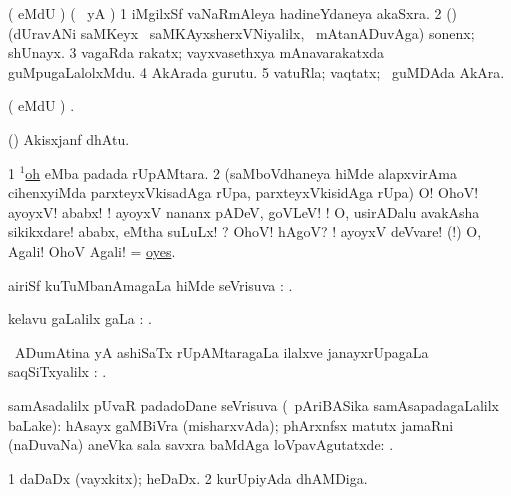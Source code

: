 \bentry
{}
\gl{\nA}
\bmng
( eMdU \parx) (\bava\  yA ) 
\bnum
\num{1} iMgilxSf vaNaRmAleya hadineYdaneya akaSxra. 
\hypertarget{O(1)2}{} 
\num{2} () (dUravANi saMKeyx \mo\ saMKAyxsherxVNiyalilx, \kanmu\ mAtanADuvAga) sonenx; shUnayx. 
\num{3}  vagaRda rakatx;  vayxvasethxya mAnavarakatxda guMpugaLalolxMdu. 
\num{4}  AkArada gurutu. 
\num{5} vatuRla; vaqtatx; \kanmu\ guMDAda AkAra. 
\enum
\emng
\eentry

\bentry
{}
\gl{\saMkiSx}
\bmng
( eMdU \parx) . 
\emng
\eentry

\bentry
{}
\gl{\saMkeV}
\bmng
(\ravi) Akisxjanf dhAtu. 
\emng
\eentry

\bentry
{}
\gl{\BAavayx}
\bmng
\bnum
\num{1} \hyperlink{oh(1)}{$^1$oh} eMba padada rUpAMtara. 
\num{2} (saMboVdhaneya hiMde alapxvirAma cihenxyiMda parxteyxVkisadAga  rUpa, parxteyxVkisidAga  rUpa) O! OhoV! ayoyxV! ababx! ! ayoyxV nananx pADeV, goVLeV! ! O, usirADalu avakAsha sikikxdare!  ababx, eMtha suLuLx! ? OhoV! hAgoV? ! ayoyxV deVvare! 
\banum
{} (!) O, Agali! OhoV Agali! 
 = \hyperlink{oyes}{oyes}. 
\eanum
\numie
\enum
\emng
\eentry

\bentry
{}
\gl{\pUparx}
\bmng
airiSf kuTuMbanAmagaLa hiMde seVrisuva \pUparx: . 
\emng
\eentry

\bentry
{}
\gl{\upa}
\bmng
kelavu \pagu gaLalilx  gaLa \saMkiSx: . 
\emng
\eentry

\bentry
{}
\gl{\uparx}
\bmng
\sA\ ADumAtina yA ashiSaTx rUpAMtaragaLa ilalxve janayxrUpagaLa saqSiTxyalilx \parx: . 
\emng
\eentry

\bentry
{}
\gl{\uparx}
\bmng
samAsadalilx pUvaR padadoDane seVrisuva \uparx (\sA\ pAriBASika samAsapadagaLalilx baLake): 
\banum
{}  hAsayx gaMBiVra (misharxvAda);  phArxnfsx matutx jamaRni (naDuvaNa) 
 aneVka sala savxra baMdAga  loVpavAgutatxde: . 
\eanum
\emng
\eentry

\bentry
{}
\gl{\nA}
\bmng
\bnum
\num{1} daDaDx (vayxkitx); heDaDx. 
\num{2} kurUpiyAda dhAMDiga. 
\enum
\emng
\eentry


